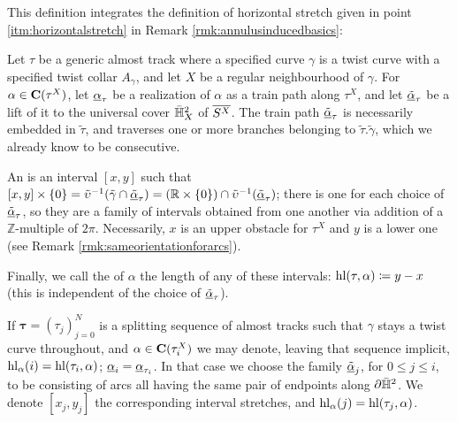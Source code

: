 This definition integrates the definition of horizontal stretch given in point \ref{itm:horizontalstretch} in Remark \ref{rmk:annulusinducedbasics}:
\begin{defin}\label{def:horizontallength}
Let $\tau$ be a generic almost track where a specified curve $\gamma$ is a twist curve with a specified twist collar $A_\gamma$, and let $X$ be a regular neighbourhood of $\gamma$. For $\alpha\in\mathbf C(\tau^X)$, let $\underline{\alpha}_\tau$ be a realization of $\alpha$ as a train path along $\tau^X$, and let $\underline{\tilde\alpha}_\tau$ be a lift of it to the universal cover $\bar{\mathbb H}^2_X$ of $\overline{S^X}$. The train path $\underline{\tilde\alpha}_\tau$ is necessarily embedded in $\tilde\tau$, and traverses one or more branches belonging to $\tilde\tau.\tilde\gamma$, which we already know to be consecutive.

An  is an interval $[x,y]$ such that $[x,y]\times\{0\}= \tilde \upsilon^{-1}(\tilde\gamma\cap\underline{\tilde\alpha}_\tau)= (\mathbb R\times\{0\})\cap \tilde\upsilon^{-1}(\underline{\tilde\alpha}_\tau)$; there is one for each choice of $\underline{\tilde\alpha}_\tau$, so they are a family of intervals obtained from one another via addition of a $\mathbb Z$-multiple of $2\pi$. Necessarily, $x$ is an upper obstacle for $\tau^X$ and $y$ is a lower one (see Remark \ref{rmk:sameorientationforarcs}).

Finally, we call the  of $\alpha$ the length of any of these intervals: $\mathrm{hl}(\tau,\alpha)\coloneqq y-x$ (this is independent of the choice of $\underline{\tilde\alpha}_\tau$).

If $\bm\tau=(\tau_j)_{j=0}^N$ is a splitting sequence of almost tracks such that $\gamma$ stays a twist curve throughout, and $\alpha\in\mathbf C(\tau_i^X)$ we may denote, leaving that sequence implicit, $\mathrm{hl}_\alpha(i)= \mathrm{hl}(\tau_i,\alpha)$; $\underline{\alpha}_i=\underline{\alpha}_{\tau_i}$. In that case we choose the family $\underline{\tilde\alpha}_j$, for $0\leq j\leq i$, to be consisting of arcs all having the same pair of endpoints along $\partial\bar{\mathbb H}^2$. We denote $[x_j,y_j]$ the corresponding interval stretches, and $\mathrm{hl}_\alpha(j)=\mathrm{hl}(\tau_j,\alpha)$.
\end{defin}

